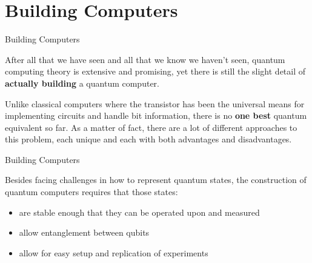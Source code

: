 \documentclass[aspectratio=43]{beamer}
\begin{document}
\section{Building \q Computers}
\begin{frame}{Building \q Computers}
    \begin{card}
        After all that we have seen and all that we know we haven't seen, quantum computing theory is extensive and promising, yet there is still the slight detail of \textbf{actually building} a quantum computer.
    \end{card}
    \begin{card}
        Unlike classical computers where the transistor has been the universal means for implementing circuits and handle bit information, there is no \textbf{one best} quantum equivalent so far. As a matter of fact, there are a lot of different approaches to this problem, each unique and each with both advantages and disadvantages.
    \end{card}
\pagenumber
\end{frame}

\begin{frame}{Building \q Computers}
    \begin{card}
        Besides facing challenges in how to represent quantum states, the construction of quantum computers requires that those states:
        \begin{itemize}
            \item are stable enough that they can be operated upon and measured
            \item allow entanglement between qubits
            \item allow for easy setup and replication of experiments
        \end{itemize}
    \end{card}
\pagenumber
\end{frame}
\end{document}
